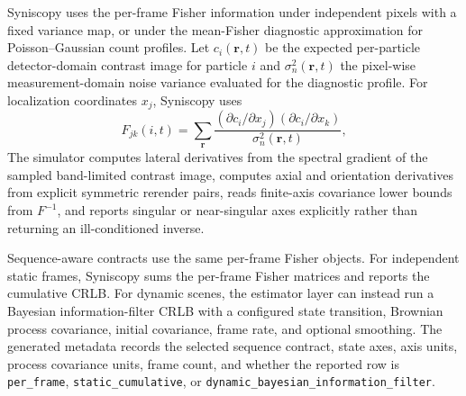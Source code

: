 Syniscopy uses the per-frame Fisher information under independent pixels with a fixed variance map, or under the mean-Fisher diagnostic approximation for Poisson--Gaussian count profiles. Let $c_i(\mathbf{r},t)$ be the expected per-particle detector-domain contrast image for particle $i$ and $\sigma_n^2(\mathbf{r},t)$ the pixel-wise measurement-domain noise variance evaluated for the diagnostic profile. For localization coordinates $x_j$, Syniscopy uses
\begin{equation}
  F_{jk}(i,t) =
  \sum_{\mathbf{r}}
  \frac{(\partial c_i/\partial x_j)(\partial c_i/\partial x_k)}
       {\sigma_n^2(\mathbf{r},t)} ,
\end{equation}
The simulator computes lateral derivatives from the spectral gradient of the sampled band-limited contrast image, computes axial and orientation derivatives from explicit symmetric rerender pairs, reads finite-axis covariance lower bounds from $F^{-1}$, and reports singular or near-singular axes explicitly rather than returning an ill-conditioned inverse.

Sequence-aware contracts use the same per-frame Fisher objects. For independent static frames, Syniscopy sums the per-frame Fisher matrices and reports the cumulative CRLB. For dynamic scenes, the estimator layer can instead run a Bayesian information-filter CRLB with a configured state transition, Brownian process covariance, initial covariance, frame rate, and optional smoothing. The generated metadata records the selected sequence contract, state axes, axis units, process covariance units, frame count, and whether the reported row is \texttt{per\_frame}, \texttt{static\_cumulative}, or \texttt{dynamic\_bayesian\_information\_filter}.

